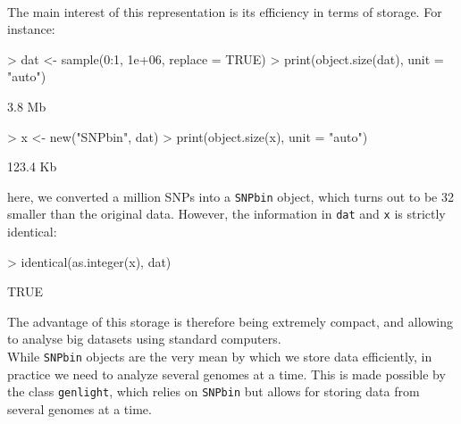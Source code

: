 \documentclass{article}
\begin{document}
~\\

The main interest of this representation is its efficiency in terms of storage.
For instance:
\begin{Schunk}
\begin{Sinput}
> dat <- sample(0:1, 1e+06, replace = TRUE)
> print(object.size(dat), unit = "auto")
\end{Sinput}
\begin{Soutput}
3.8 Mb
\end{Soutput}
\begin{Sinput}
> x <- new("SNPbin", dat)
> print(object.size(x), unit = "auto")
\end{Sinput}
\begin{Soutput}
123.4 Kb
\end{Soutput}
\end{Schunk}
here, we converted a million SNPs into a \texttt{SNPbin} object, which turns out to be
32 smaller than the original data.
However, the information in \texttt{dat} and \texttt{x} is strictly identical:
\begin{Schunk}
\begin{Sinput}
> identical(as.integer(x), dat)
\end{Sinput}
\begin{Soutput}
[1] TRUE
\end{Soutput}
\end{Schunk}
The advantage of this storage is therefore being extremely compact, and allowing to analyse big
datasets using standard computers.
\\

While \texttt{SNPbin} objects are the very mean by which we store data efficiently, in practice
we need to analyze several genomes at a time.
This is made possible by the class \texttt{genlight}, which relies on \texttt{SNPbin} but allows for
storing data from several genomes at a time.




\end{document}

